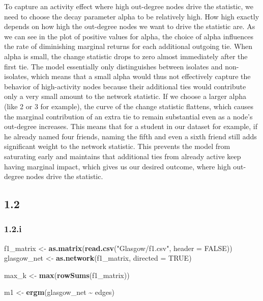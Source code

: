 \documentclass[
]{article}
\newenvironment{Shaded}{\begin{snugshade}}{\end{snugshade}}
\newcommand{\AttributeTok}[1]{\textcolor[rgb]{0.13,0.29,0.53}{#1}}
\newcommand{\ConstantTok}[1]{\textcolor[rgb]{0.56,0.35,0.01}{#1}}
\newcommand{\FunctionTok}[1]{\textcolor[rgb]{0.13,0.29,0.53}{\textbf{#1}}}
\newcommand{\NormalTok}[1]{#1}
\newcommand{\OtherTok}[1]{\textcolor[rgb]{0.56,0.35,0.01}{#1}}
\newcommand{\SpecialCharTok}[1]{\textcolor[rgb]{0.81,0.36,0.00}{\textbf{#1}}}
\newcommand{\StringTok}[1]{\textcolor[rgb]{0.31,0.60,0.02}{#1}}
\begin{document}
To capture an activity effect where high out-degree nodes drive the
statistic, we need to choose the decay parameter alpha to be relatively
high. How high exactly depends on how high the out-degree nodes we want
to drive the statistic are. As we can see in the plot of positive values
for alpha, the choice of alpha influences the rate of diminishing
marginal returns for each additional outgoing tie. When alpha is small,
the change statistic drops to zero almost immediately after the first
tie. The model essentially only distinguishes between isolates and
non-isolates, which means that a small alpha would thus not effectively
capture the behavior of high-activity nodes because their additional
ties would contribute only a very small amount to the network statistic.
If we choose a larger alpha (like 2 or 3 for example), the curve of the
change statistic flattens, which causes the marginal contribution of an
extra tie to remain substantial even as a node's out-degree increases.
This means that for a student in our dataset for example, if he already
named four friends, naming the fifth and even a sixth friend still adds
significant weight to the network statistic. This prevents the model
from saturating early and maintains that additional ties from already
active keep having marginal impact, which gives us our desired outcome,
where high out-degree nodes drive the statistic.

\subsection{1.2}\label{section-1}

\subsubsection{1.2.i}\label{i-1}

\begin{Shaded}
\begin{Highlighting}[]
\NormalTok{f1\_matrix }\OtherTok{\textless{}{-}} \FunctionTok{as.matrix}\NormalTok{(}\FunctionTok{read.csv}\NormalTok{(}\StringTok{"Glasgow/f1.csv"}\NormalTok{, }\AttributeTok{header =} \ConstantTok{FALSE}\NormalTok{))}
\NormalTok{glasgow\_net }\OtherTok{\textless{}{-}} \FunctionTok{as.network}\NormalTok{(f1\_matrix, }\AttributeTok{directed =} \ConstantTok{TRUE}\NormalTok{)}

\NormalTok{max\_k }\OtherTok{\textless{}{-}} \FunctionTok{max}\NormalTok{(}\FunctionTok{rowSums}\NormalTok{(f1\_matrix))}

\NormalTok{m1 }\OtherTok{\textless{}{-}} \FunctionTok{ergm}\NormalTok{(glasgow\_net }\SpecialCharTok{\textasciitilde{}}\NormalTok{ edges)}
\end{Highlighting}
\end{Shaded}
\end{document}
